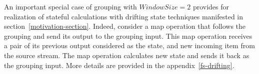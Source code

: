 




An important special case of grouping with $Window Size = 2$  provides for realization of stateful calculations with drifting state techniques manifested in section~\ref{motivation-section}.  
Indeed, consider a map operation that follows the grouping and send its output to the grouping input. This map operation receives a pair of its previous output considered as the state, and new incoming item from the source stream. The map operation calculates new state and sends it back as the grouping input. 
More details are provided in the appendix~\ref{fs-drifting}.




